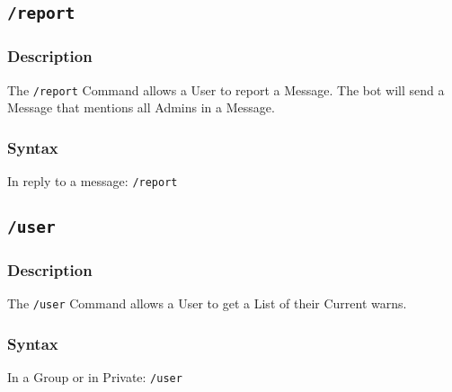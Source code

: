 \documentclass[a4paper]{article}
\begin{document}
    \subsection{\texttt{/report}}
        \subsubsection*{Description}
            The \texttt{/report} Command allows a User to report a Message. The bot will send a Message that mentions all Admins in a Message.

        \subsubsection*{Syntax}
            In reply to a message: \texttt{/report}\\

    \subsection{\texttt{/user}}
        \subsubsection*{Description}
            The \texttt{/user} Command allows a User to get a List of their Current warns.

        \subsubsection*{Syntax}
            In a Group or in Private: \texttt{/user}\\
\end{document}
